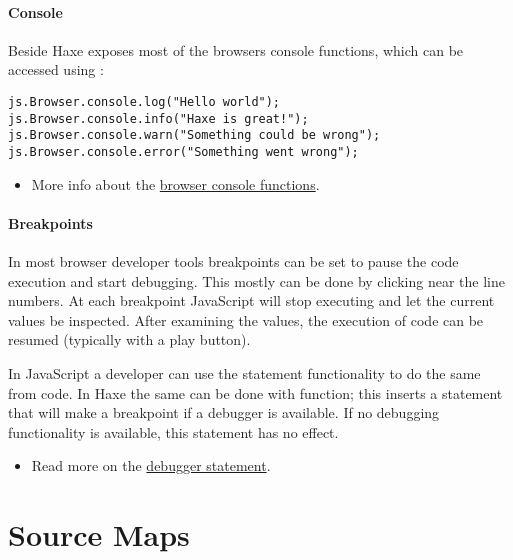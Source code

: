 \paragraph{Console}

Beside  Haxe exposes most of the browsers console functions, which can be accessed using \href{http://api.haxe.org/v/dev/js/html/Console.html}{}:

\begin{lstlisting}
js.Browser.console.log("Hello world"); 
js.Browser.console.info("Haxe is great!"); 
js.Browser.console.warn("Something could be wrong"); 
js.Browser.console.error("Something went wrong"); 
\end{lstlisting}


\begin{itemize}
	\item More info about the \href{https://developer.mozilla.org/en-US/docs/Web/API/Console}{browser console functions}.
\end{itemize}

\paragraph{Breakpoints}

In most browser developer tools breakpoints can be set to pause the code execution and start debugging. This mostly can be done by clicking near the line numbers. At each breakpoint JavaScript will stop executing and let the current values be inspected. After examining the values, the execution of code can be resumed (typically with a play button).

In JavaScript a developer can use the  statement functionality to do the same from code.
In Haxe the same can be done with \href{http://api.haxe.org/v/js/Lib.html#debug}{} function; this inserts a  statement that will make a breakpoint if a debugger is available. If no debugging functionality is available, this statement has no effect. 

\begin{itemize}
	\item Read more on the \href{https://developer.mozilla.org/en/docs/Web/JavaScript/Reference/Statements/debugger}{debugger statement}.
\end{itemize}


\section{Source Maps}
\label{debugging-source-map}


